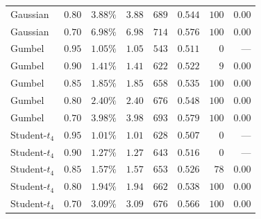 \begin{tabular}{llrrrrrr}
Gaussian & $0.80$ & $3.88\%$ & $3.88$ & $689$ & $0.544$ & $100$ & 0.00 \\
Gaussian & $0.70$ & $6.98\%$ & $6.98$ & $714$ & $0.576$ & $100$ & 0.00 \\
Gumbel & $0.95$ & $1.05\%$ & $1.05$ & $543$ & $0.511$ & $0$ & --- \\
Gumbel & $0.90$ & $1.41\%$ & $1.41$ & $622$ & $0.522$ & $9$ & 0.00 \\
Gumbel & $0.85$ & $1.85\%$ & $1.85$ & $658$ & $0.535$ & $100$ & 0.00 \\
Gumbel & $0.80$ & $2.40\%$ & $2.40$ & $676$ & $0.548$ & $100$ & 0.00 \\
Gumbel & $0.70$ & $3.98\%$ & $3.98$ & $693$ & $0.579$ & $100$ & 0.00 \\
Student-$t_4$ & $0.95$ & $1.01\%$ & $1.01$ & $628$ & $0.507$ & $0$ & --- \\
Student-$t_4$ & $0.90$ & $1.27\%$ & $1.27$ & $643$ & $0.516$ & $0$ & --- \\
Student-$t_4$ & $0.85$ & $1.57\%$ & $1.57$ & $653$ & $0.526$ & $78$ & 0.00 \\
Student-$t_4$ & $0.80$ & $1.94\%$ & $1.94$ & $662$ & $0.538$ & $100$ & 0.00 \\
Student-$t_4$ & $0.70$ & $3.09\%$ & $3.09$ & $676$ & $0.566$ & $100$ & 0.00 \\
\bottomrule
\end{tabular}
